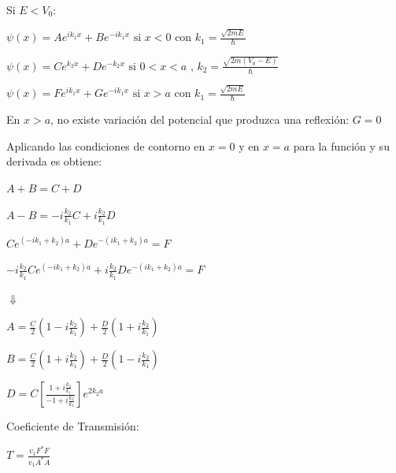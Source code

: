 \documentclass[oneside]{book}
\numberwithin{equation}{section}
\numberwithin{figure}{section}
\numberwithin{table}{section}
\begin{document}
				\begin{minipage}[t]{0.5\textwidth}	
				
				Si $E<V_0$:\\				
				
				\begin{center}
					$\displaystyle \psi(x)=Ae^{ik_1x}+Be^{-ik_1x} \text{ si } x<0 \text{ con } k_1=\frac{\sqrt{2mE}}{\hbar}$	
				\end{center}				
				\begin{center}
					$\displaystyle \psi(x)=Ce^{k_2x}+De^{-k_2x} \text{ si } 0<x<a \text{ , } k_2=\frac{\sqrt{2m(V_0-E)}}{\hbar}$	
				\end{center}			
				\begin{center}
					$\displaystyle \psi(x)=Fe^{ik_1x}+Ge^{-ik_1x} \text{ si } x>a \text{ con } k_1=\frac{\sqrt{2mE}}{\hbar}$	
				\end{center}			
				\begin{center}
					En $x>a$, no existe variación del potencial que produzca una reflexión: $G=0$
				\end{center}
				\begin{center}
					Aplicando	 las condiciones de contorno en $x=0$ y en $x=a$ para la función y su derivada es obtiene:
				\end{center}
				\begin{center}
					$\displaystyle A+B=C+D$	
				\end{center}		
				\begin{center}
					$\displaystyle A-B=-i\frac{k_2}{k_1}C+i\frac{k_2}{k_1}D$	
				\end{center}		
				\begin{center}
					$\displaystyle Ce^{(-ik_1+k_2)a}+De^{-(ik_1+k_2)a}=F$	
				\end{center}		
				\begin{center}
					$\displaystyle -i\frac{k_2}{k_1}Ce^{(-ik_1+k_2)a}+i\frac{k_2}{k_1}De^{-(ik_1+k_2)a}=F$	
				\end{center}							
				\begin{center}
					$\Downarrow$
				\end{center}
				\begin{center}
					$\displaystyle A=\frac{C}{2}\left(1-i\frac{k_2}{k_1}\right)+\frac{D}{2}\left(1+i\frac{k_2}{k_1}\right)$	
				\end{center}		
				\begin{center}
					$\displaystyle B=\frac{C}{2}\left(1+i\frac{k_2}{k_1}\right)+\frac{D}{2}\left(1-i\frac{k_2}{k_1}\right)$	
				\end{center}		
				\begin{center}
					$\displaystyle D=C\left[\frac{1+i\frac{k_2}{k_1}}{-1+i\frac{k_2}{k_1}}\right]e^{2k_2a}$	
				\end{center}						
								
				\begin{center}
					Coeficiente de Transmisión:\\
				\end{center}
				\begin{center}
					$\displaystyle T=\frac{v_1F^*F}{v_1A^*A}$
				\end{center}								
						
				\end{minipage}
\end{document}
